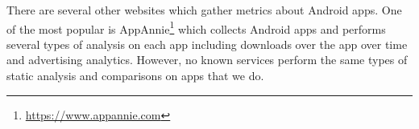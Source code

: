 There are several other websites which gather metrics about Android apps. One of the most popular is AppAnnie\footnote{\url{https://www.appannie.com}} which collects Android apps and performs several types of analysis on each app including downloads over the app over time and advertising analytics. However, no known services perform the same types of static analysis and comparisons on apps that we do.





